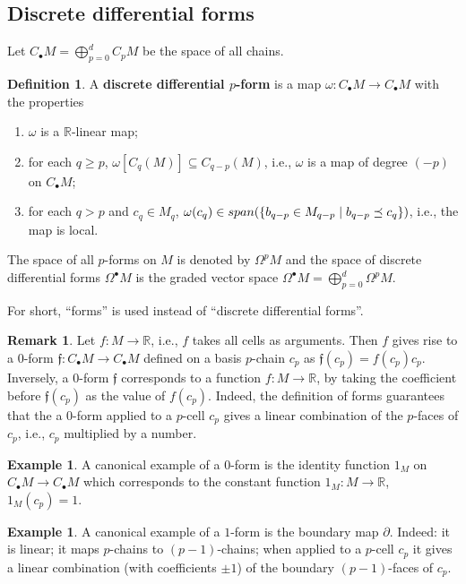 \documentclass{elsarticle}
\theoremstyle{definition}
\newtheorem{definition}[theorem]{Definition}
\newtheorem{example}[theorem]{Example}
\newtheorem{remark}[theorem]{Remark}
\newcommand{\R}{\mathbb{R}} %
\newcommand{\linearspan}{\mathop{\rm span}\nolimits}
\begin{document}
\subsection{Discrete differential forms}
\label{sec:forms}
Let $C_\bullet M = \bigoplus_{p = 0}^{d} C_{p} M$ be the space of all chains.
\begin{definition}
\label{thm:discrtete_differential_form}
  A \textbf{discrete differential $p$-form} is a map $\omega \colon C_{\bullet} M \to C_{\bullet} M$ with the properties
  \begin{enumerate}
    \item
      $\omega$ is a $\R$-linear map;
    \item
      for each $q \geq p$, $\omega[C_{q}(M)] \subseteq C_{q - p}(M)$, i.e., $\omega$ is a map of degree $(-p)$ on $C_{\bullet}M$;
    \item
      for each $q > p$ and $c_q \in M_{q}$, $\omega(c_q) \in \linearspan (\{b_{q - p} \in M_{q - p} \mid b_{q - p} \preceq c_q\})$, i.e., the map is local.
  \end{enumerate}
The space of all $p$-forms on $M$ is denoted by $\Omega^{p} M$ and the space of discrete differential forms $\Omega^{\bullet} M$ is the graded vector space $\Omega^{\bullet} M = \bigoplus_{p = 0}^{d} \Omega^{p} M$.
\end{definition}
\noindent For short, ``forms'' is used instead of ``discrete differential forms''.
\begin{remark}
  Let $f \colon M \to \R$, i.e., $f$ takes all cells as arguments. Then $f$ gives rise to a $0$-form $\mathfrak{f} \colon C_\bullet M \to C_\bullet M$ defined on a basis $p$-chain $c_p$ as $ \mathfrak{f}(c_p) = f(c_p) c_p$.
  Inversely, a $0$-form $\mathfrak{f}$ corresponds to a function $f \colon M \to \R$, by taking the coefficient before $\mathfrak{f}(c_p)$ as the value of $f(c_p)$. Indeed, the definition of forms guarantees that the a $0$-form applied to a $p$-cell $c_p$ gives a linear combination of the $p$-faces of $c_p$, i.e., $c_p$ multiplied by a number.
\end{remark}
\begin{example}
  A canonical example of a $0$-form is the identity function $\mathfrak{1}_M$ on $C_\bullet M \to C_\bullet M$ which corresponds to the constant function $\mathfrak{1}_M \colon M \to \R$, $\mathfrak{1}_M(c_p) = 1$.
\end{example}
\begin{example}
  A canonical example of a $1$-form is the boundary map $\partial$. Indeed: it is linear; it maps $p$-chains to $(p - 1)$-chains; when applied to a $p$-cell $c_p$ it gives a linear combination (with coefficients $\pm 1$) of the boundary $(p - 1)$-faces of $c_p$.
\end{example}
\end{document}
